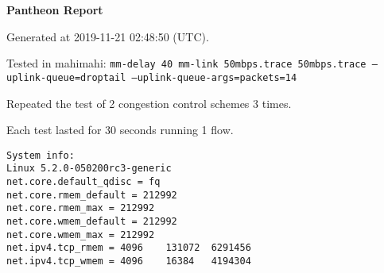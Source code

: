 \documentclass{article}
\begin{document}
\centerline{\textbf{\large{Pantheon Report}}}
\vspace{20pt}

Generated at 2019-11-21 02:48:50 (UTC).

Tested in mahimahi: \texttt{mm-delay 40 mm-link 50mbps.trace 50mbps.trace --uplink-queue=droptail --uplink-queue-args=packets=14}

Repeated the test of 2 congestion control schemes 3 times.

Each test lasted for 30 seconds running 1 flow.

\begin{verbatim}
System info:
Linux 5.2.0-050200rc3-generic
net.core.default_qdisc = fq
net.core.rmem_default = 212992
net.core.rmem_max = 212992
net.core.wmem_default = 212992
net.core.wmem_max = 212992
net.ipv4.tcp_rmem = 4096	131072	6291456
net.ipv4.tcp_wmem = 4096	16384	4194304
\end{verbatim}
\end{document}
